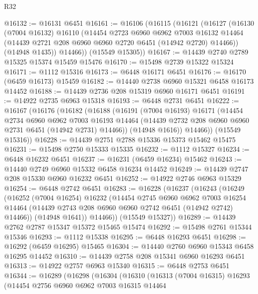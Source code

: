\begin{lexlean}{R32}
\begin{coremodule}
@16132 := @16131 @6451
@16161 := @16106
    (@16115
      (@16121
        (@16127
          (@16130
            (@7004 @16132)
            @16110
            (@14454
              @2723
              @6960
              @6962
              @7003
              @16132
              @14464
              (@14439 @2721 @208 @6960 @6960 @2720 @6451 (@14942 @2720) @14466))
            (@14948 @1435))
          @14466))
      (@15549 @15305))
@16167 := @14439 @2740 @2789 @15325 @15374 @15459 @15476
@16170 := @15498 @2739 @15322 @15324
@16171 := @1112 @15316
@16173 := @6448 @16171 @6451
@16176 := @16170 (@6459 @16173) @15459
@16182 := @14440 @2738 @6960 @15321 @6458 @16173 @14452
@16188 := @14439 @2736 @208 @15319 @6960 @16171 @6451
@16191 := @14922 @2735 @6963 @15318
@16193 := @6448 @2731 @6451
@16222 := @16167
    (@16176
      (@16182
        (@16188
          (@16191
            (@7004 @16193)
            @16171
            (@14454
              @2734
              @6960
              @6962
              @7003
              @16193
              @14464
              (@14439 @2732 @208 @6960 @6960 @2731 @6451 (@14942 @2731) @14466))
            (@14948 @1616))
          @14466))
      (@15549 @15316))
@16228 := @14439 @2751 @2788 @15336 @15373 @15462 @15475
@16231 := @15498 @2750 @15333 @15335
@16232 := @1112 @15327
@16234 := @6448 @16232 @6451
@16237 := @16231 (@6459 @16234) @15462
@16243 := @14440 @2749 @6960 @15332 @6458 @16234 @14452
@16249 := @14439 @2747 @208 @15330 @6960 @16232 @6451
@16252 := @14922 @2746 @6963 @15329
@16254 := @6448 @2742 @6451
@16283 := @16228
    (@16237
      (@16243
        (@16249
          (@16252
            (@7004 @16254)
            @16232
            (@14454
              @2745
              @6960
              @6962
              @7003
              @16254
              @14464
              (@14439 @2743 @208 @6960 @6960 @2742 @6451 (@14942 @2742) @14466))
            (@14948 @1641))
          @14466))
      (@15549 @15327))
@16289 := @14439 @2762 @2787 @15347 @15372 @15465 @15474
@16292 := @15498 @2761 @15344 @15346
@16293 := @1112 @15338
@16295 := @6448 @16293 @6451
@16298 := @16292 (@6459 @16295) @15465
@16304 := @14440 @2760 @6960 @15343 @6458 @16295 @14452
@16310 := @14439 @2758 @208 @15341 @6960 @16293 @6451
@16313 := @14922 @2757 @6963 @15340
@16315 := @6448 @2753 @6451
@16344 := @16289
    (@16298
      (@16304
        (@16310
          (@16313
            (@7004 @16315)
            @16293
            (@14454
              @2756
              @6960
              @6962
              @7003
              @16315
              @14464

\end{coremodule}
\end{lexlean}
